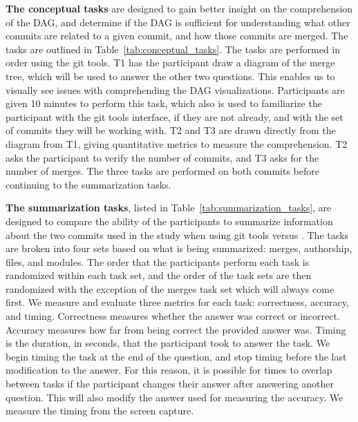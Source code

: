 \textbf{The conceptual tasks} are designed to gain better insight on the
comprehension of the DAG, and determine if the DAG is sufficient for
understanding what other commits are related to a given commit, and how
those commits are merged. The tasks are outlined in
Table~\ref{tab:conceptual_tasks}. The tasks are performed in order
using the git tools. T1 has the participant draw a diagram of the merge
tree, which will be used to answer the other two questions. This enables
us to visually see issues with comprehending the DAG visualizations.
Participants are given 10 minutes to perform this task, which also is
used to familiarize the participant with the git tools interface, if
they are not already, and with the set of commits they will be working
with. T2 and T3 are drawn directly from the diagram from T1, giving
quantitative metrics to measure the comprehension. T2 asks the
participant to verify the number of commits, and T3 asks for the number
of merges. The three tasks are performed on both commits before
continuing to the summarization tasks.


\textbf{The summarization tasks}, listed in Table~\ref{tab:summarization_tasks},
are designed to compare the ability of the participants to summarize
information about the two commits used in the study when using git tools
versus \tool. The tasks are broken into four sets based on what is being
summarized: merges, authorship, files, and modules. The order that the
participants perform each task is randomized within each task set, and
the order of the task sets are then randomized with the exception of the
merges task set which will always come first. We measure and evaluate
three metrics for each task: correctness, accuracy, and timing.
Correctness measures whether the answer was correct or incorrect.
Accuracy measures how far from being correct the provided answer was.
Timing is the duration, in seconds, that the participant took to answer
the task. We begin timing the task at the end of the question, and stop
timing before the last modification to the answer. For this reason, it
is possible for times to overlap between tasks if the participant
changes their answer after answering another question. This will also
modify the answer used for measuring the accuracy. We measure the timing
from the screen capture.




